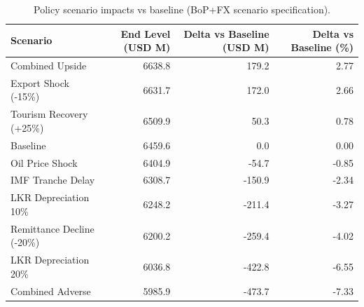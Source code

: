 \begin{table}[!htbp]
\centering
\small
\begin{tabular}{lrrr}
\toprule
Scenario & End Level (USD M) & Delta vs Baseline (USD M) & Delta vs Baseline (\%) \\
\midrule
Combined Upside & 6638.8 & 179.2 & 2.77 \\
Export Shock (-15\%) & 6631.7 & 172.0 & 2.66 \\
Tourism Recovery (+25\%) & 6509.9 & 50.3 & 0.78 \\
Baseline & 6459.6 & 0.0 & 0.00 \\
Oil Price Shock & 6404.9 & -54.7 & -0.85 \\
IMF Tranche Delay & 6308.7 & -150.9 & -2.34 \\
LKR Depreciation 10\% & 6248.2 & -211.4 & -3.27 \\
Remittance Decline (-20\%) & 6200.2 & -259.4 & -4.02 \\
LKR Depreciation 20\% & 6036.8 & -422.8 & -6.55 \\
Combined Adverse & 5985.9 & -473.7 & -7.33 \\
\bottomrule
\end{tabular}
\caption{Policy scenario impacts vs baseline (BoP+FX scenario specification).}
\label{tab:policy_impacts_bop_fx}
\end{table}
